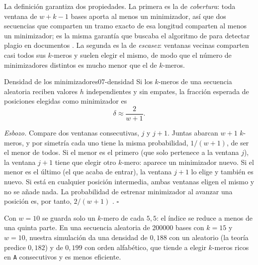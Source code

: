 \begin{simbolos}
\end{simbolos}

La definición garantiza dos propiedades. La primera es la de \emph{cobertura}: toda ventana de $w+k-1$ bases aporta al menos un minimizador, así que dos secuencias que comparten un tramo exacto de esa longitud comparten al menos un minimizador; es la misma garantía que buscaba el algoritmo de  para detectar plagio en documentos \parencite{c07-schleimer2003}. La segunda es la de \emph{escasez}: ventanas vecinas comparten casi todos sus $k$-meros y suelen elegir el mismo, de modo que el número de minimizadores distintos es mucho menor que el de $k$-meros.

\begin{teorema}{Densidad de los minimizadores}{07-densidad}
Si los $k$-meros de una secuencia aleatoria reciben valores $h$ independientes y sin empates, la fracción esperada de posiciones elegidas como minimizador es
\begin{equation}\label{eq:07-densidad}
\delta \approx \frac{2}{w+1}.
\end{equation}
\end{teorema}

\begin{simbolos}
\end{simbolos}

\noindent\textit{Esbozo.} Compare dos ventanas consecutivas, $j$ y $j+1$. Juntas abarcan $w+1$ $k$-meros, y por simetría cada uno tiene la misma probabilidad, $1/(w+1)$, de ser el menor de todos. Si el menor es el primero (que solo pertenece a la ventana $j$), la ventana $j+1$ tiene que elegir otro $k$-mero: aparece un minimizador nuevo. Si el menor es el último (el que acaba de entrar), la ventana $j+1$ lo elige y también es nuevo. Si está en cualquier posición intermedia, ambas ventanas eligen el mismo y no se añade nada. La probabilidad de estrenar minimizador al avanzar una posición es, por tanto, $2/(w+1)$ \parencite{c07-schleimer2003}. \hfill$\square$

Con $w=10$ se guarda solo un $k$-mero de cada $5{,}5$: el índice se reduce a menos de una quinta parte. En una secuencia aleatoria de \num{200000} bases con $k=15$ y $w=10$, nuestra simulación da una densidad de $0{,}188$ con un  aleatorio (la teoría predice $0{,}182$) y de $0{,}199$ con orden alfabético, que tiende a elegir $k$-meros ricos en \texttt{A} consecutivos y es menos eficiente.

